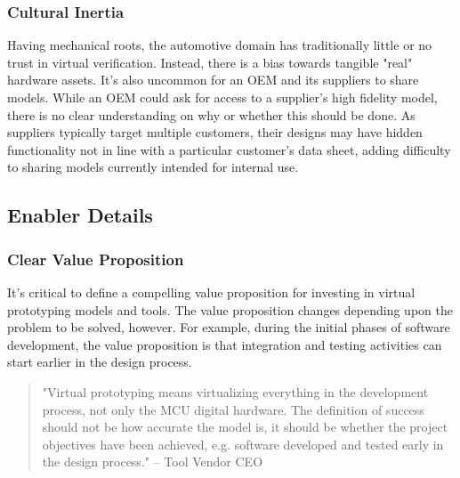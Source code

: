 \subsubsection*{Cultural Inertia}
Having mechanical roots, the automotive domain has traditionally little or no trust in virtual verification. Instead, there is a bias towards tangible "real" hardware assets.
It's also uncommon for an OEM and its suppliers to share models.
While an OEM could ask for access to a supplier’s high fidelity model, there is no clear understanding on why or whether this should be done.
As suppliers typically target multiple customers, their designs may have hidden functionality not in line with a particular customer’s data sheet,
adding difficulty to sharing models currently intended for internal use.



\subsection{Enabler Details}
\subsubsection*{Clear Value Proposition}
It's critical to define a compelling value proposition for investing in virtual prototyping models and tools.
The value proposition changes depending upon the problem to be solved, however.
For example, during the initial phases of software development,
the value proposition is that
integration and testing activities can start earlier in the design process.

\begin{quote}
"Virtual prototyping means virtualizing everything in the development process, not only the MCU digital hardware.
The definition of success should not be how accurate the model is,
it should be whether the project objectives have been achieved, e.g. software developed and tested early in the design process."
-- Tool Vendor CEO
\end{quote}

